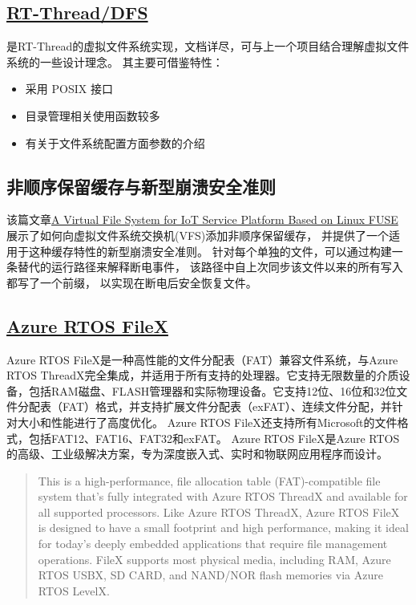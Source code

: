 \documentclass[UTF8,a4paper]{ctexart}
\begin{document}
\subsection{\href{https://www.rt-thread.org/document/site/\#/rt-thread-version/rt-thread-standard/programming-manual/filesystem/filesystem}{RT-Thread/DFS}}
是RT-Thread的虚拟文件系统实现，文档详尽，可与上一个项目结合理解虚拟文件系统的一些设计理念。
其主要可借鉴特性：
\begin{itemize}
    \item 采用 POSIX 接口
    \item 目录管理相关使用函数较多
    \item 有关于文件系统配置方面参数的介绍
\end{itemize}

\subsection{非顺序保留缓存与新型崩溃安全准则}
该篇文章\href{run:./ref/Modular Integration of Crashsafe Caching into a Verified Virtual File System Switch.pdf}{A Virtual File System for IoT Service Platform Based on Linux FUSE}
展示了如何向虚拟文件系统交换机(VFS)添加非顺序保留缓存，
并提供了一个适用于这种缓存特性的新型崩溃安全准则。
针对每个单独的文件，可以通过构建一条替代的运行路径来解释断电事件，
该路径中自上次同步该文件以来的所有写入都写了一个前缀，
以实现在断电后安全恢复文件。

\subsection{\href{https://github.com/azure-rtos/filex}{Azure RTOS FileX}}
	Azure RTOS FileX是一种高性能的文件分配表（FAT）兼容文件系统，与Azure RTOS ThreadX完全集成，并适用于所有支持的处理器。它支持无限数量的介质设备，包括RAM磁盘、FLASH管理器和实际物理设备。它支持12位、16位和32位文件分配表（FAT）格式，并支持扩展文件分配表（exFAT）、连续文件分配，并针对大小和性能进行了高度优化。
	Azure RTOS FileX还支持所有Microsoft的文件格式，包括FAT12、FAT16、FAT32和exFAT。
	Azure RTOS FileX是Azure RTOS的高级、工业级解决方案，专为深度嵌入式、实时和物联网应用程序而设计。
	\begin{quote}
		This is a high-performance, file allocation table (FAT)-compatible file system that's fully integrated with Azure RTOS ThreadX and available for all supported processors. 
        Like Azure RTOS ThreadX, Azure RTOS FileX is designed to have a small footprint and high performance, making it ideal for today's deeply embedded applications that require file management operations. 
        FileX supports most physical media, including RAM, Azure RTOS USBX, SD CARD, and NAND/NOR flash memories via Azure RTOS LevelX.
	\end{quote}
\end{document}
